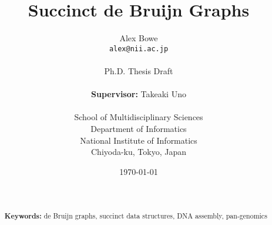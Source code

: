 \documentclass[11pt,a4paper]{report}
\begin{document}
\title{Succinct de Bruijn Graphs}
\author{Alex Bowe\\
\texttt{alex@nii.ac.jp} \\ \\
Ph.D. Thesis Draft\\ \\
\textbf{Supervisor:} Takeaki Uno\\ \\
School of Multidisciplinary Sciences \\
Department of Informatics \\
National Institute of Informatics \\
Chiyoda-ku, Tokyo, Japan}

\date{\today}

\maketitle

\begin{abstract}
 \\ \\
\textbf{Keywords:} de Bruijn graphs, succinct data structures, DNA assembly, pan-genomics
\end{abstract}


%




\setcounter{tocdepth}{1}
\newpage
\tableofcontents
\newpage

%
%
%



%
%


%


%


%


%
%






%

\nocite{*} %


%
\end{document}
